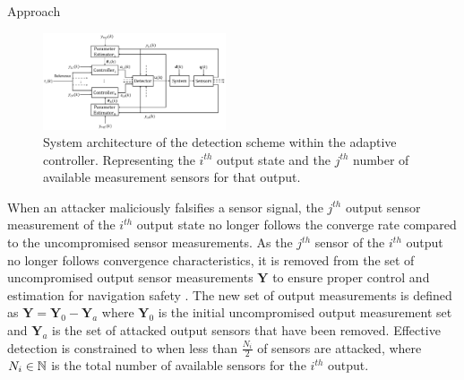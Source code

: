 \begin{section}{Approach}
\begin{figure}[ht!]
\vspace{1pt}
\centering
\includegraphics[width=0.48\textwidth]{con_and_det.png}
\caption{System architecture of the detection scheme within the adaptive controller. Representing the $i^{th}$ output state and the $j^{th}$ number of available measurement sensors for that output.}
\label{fig:det_arch}
\end{figure}
When an attacker maliciously falsifies a sensor signal, the $j^{th}$ output sensor measurement of the $i^{th}$ output state  no longer follows the converge rate compared to the uncompromised sensor measurements. As the $j^{th}$ sensor of the $i^{th}$ output no longer follows convergence characteristics, it is removed from the set of uncompromised output sensor measurements $\bm{Y}$ to ensure proper control and estimation for navigation safety . The new set of output measurements is defined as $\bm{Y}=\bm{Y}_0-\bm{Y}_a$ where $\bm{Y}_0$ is the initial uncompromised output measurement set and $\bm{Y}_a$ is the set of attacked output sensors that have been removed. Effective detection is constrained to when less than $\frac{N_i}{2}$ of sensors are attacked, where $N_i \in \mathbb{N}$ is the total number of available sensors for the $i^{th}$ output.




\end{section}
